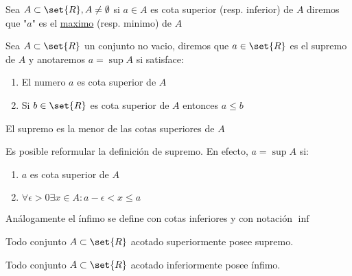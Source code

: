 \documentclass[11pt]{book}
\begin{document}
    \begin{defn}
        Sea $A\subset\set{R},A\neq\emptyset$ si $a\in A$ es cota superior (resp. inferior) de $A$ diremos que "$a$" es el \underline{maximo} (resp. minimo) de $A$
    \end{defn}
    \begin{defn}[Supremo]
        Sea $A\subset\set{R}$ un conjunto no vacio, diremos que $a\in\set{R}$ es el supremo de $A$ y anotaremos $a=\sup A$ si satisface:
        \begin{enumerate}
            \item El numero $a$ es cota superior de $A$

            \item Si $b\in\set{R}$ es cota superior de $A$ entonces $a\leq b$
        \end{enumerate}
    \end{defn}

    \begin{obs}
        El supremo es la menor de las cotas superiores de $A$
    \end{obs}

    \begin{obs}
        Es posible reformular la definición de supremo. En efecto, $a=\sup A$ si:
        \begin{enumerate}
            \item $a$ es cota superior de $A$

            \item $\forall\epsilon>0\exists x\in A:a-\epsilon<x\leq a$

        \end{enumerate}
    \end{obs}

    \begin{defn}[Ínfimo]
        Análogamente el ínfimo se define con cotas inferiores y con notación $\inf$
    \end{defn}
    \begin{defn}
        Todo conjunto $A\subset\set{R}$ acotado superiormente posee supremo.
    \end{defn}
    \begin{obs}
        Todo conjunto $A\subset\set{R}$ acotado inferiormente posee ínfimo.
    \end{obs}
\end{document}
